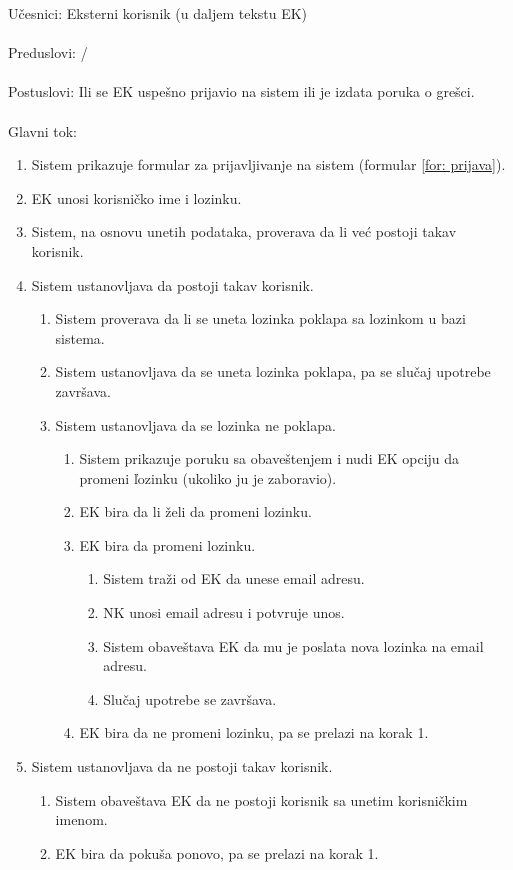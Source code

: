 \noindent U\v cesnici: Eksterni korisnik (u daljem tekstu EK)
\\
\\ Preduslovi: /
\\
\\ Postuslovi: Ili se EK uspe\v sno prijavio na sistem ili je izdata poruka o gre\v sci.
\\ 
\\ Glavni tok:
\begin{enumerate}
	\item Sistem prikazuje formular za prijavljivanje na sistem (formular \ref{for: prijava}).
	\item EK unosi korisni\v cko ime i lozinku.
	\item Sistem, na osnovu unetih podataka, proverava da li ve\'c postoji takav korisnik.
	\item Sistem ustanovljava da postoji takav korisnik.
	\begin{enumerate}
		\item Sistem proverava da li se uneta lozinka poklapa sa lozinkom u bazi sistema.
		\item Sistem ustanovljava da se uneta lozinka poklapa, pa se slu\v caj upotrebe zavr\v sava.
		\item Sistem ustanovljava da se lozinka ne poklapa.
		\begin{enumerate}
			\item Sistem prikazuje poruku sa obave\v stenjem i nudi EK opciju da promeni \v lozinku (ukoliko ju je zaboravio).
			\item EK bira da li \v zeli da promeni lozinku.
			\item EK bira da promeni lozinku.
			\begin{enumerate}
				\item Sistem tra\v zi od EK da unese email adresu.
				\item NK unosi email adresu i potvr\dj uje unos.
				\item Sistem obave\v stava EK da mu je poslata nova lozinka na email adresu.
				\item Slu\v caj upotrebe se zavr\v sava.
			\end{enumerate}
			\item EK bira da ne promeni lozinku, pa se prelazi na korak 1.
		\end{enumerate}
	\end{enumerate}
	\item Sistem ustanovljava da ne postoji takav korisnik.
	\begin{enumerate}
		\item Sistem obave\v stava EK da ne postoji korisnik sa unetim korisni\v ckim imenom.
		\item EK bira da poku\v sa ponovo, pa se prelazi na korak 1.
	\end{enumerate}
\end{enumerate}

